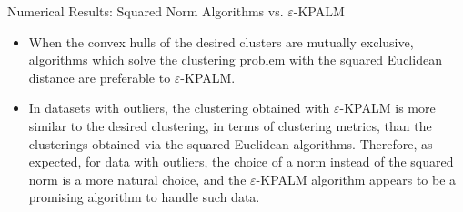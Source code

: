 \documentclass[9pt,handout]{beamer} %
\begin{document}
	\begin{frame}{Numerical Results: Squared Norm Algorithms vs. $\varepsilon$-KPALM}
		\setcounter{subfigure}{0}
		\begin{figure}
		    \centering
		\end{figure}
		\pause
		\begin{itemize}[<+->]
			\item When the convex hulls of the desired clusters are mutually exclusive, algorithms which solve the clustering problem with the squared Euclidean distance are preferable to $\varepsilon$-KPALM.
			\item In datasets with outliers, the clustering obtained with $\varepsilon$-KPALM is more similar to the desired clustering, in terms of clustering metrics, than the clusterings obtained via the squared Euclidean algorithms. 
				Therefore, as expected, for data  with outliers, the choice of a norm instead of the squared norm is a more natural choice, and the $\varepsilon$-KPALM algorithm appears to be a promising algorithm to handle such data.
		\end{itemize}
	\end{frame}		
	
\end{document}
